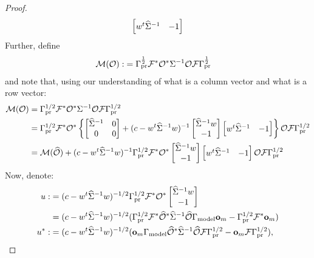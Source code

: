 \documentclass{amsart}
\numberwithin{equation}{section}
\begin{document}
\begin{proof}
\begin{align*}
\begin{bmatrix}
      w^t \widehat{\Sigma}^{-1} & -1 
    \end{bmatrix}
  \end{align*}
  Further, define
  \begin{align*}
    \mathcal{M} (\mathcal{O} ):&= \Gamma_{\textup{pr}}^{\frac12}\mathcal{F}^* \mathcal{O}^* \Sigma^{-1} \mathcal{O} \mathcal{F}
    \Gamma_{\textup{pr}}^{\frac12}    
  \end{align*}
  and note that, using our understanding of what is a column vector and
  what is a row vector:
  \begin{align*}
    \mathcal{M}(\mathcal{O}) &= \Gamma_{\textup{pr}}^{1/2} \mathcal{F}^* \mathcal{O}^* \Sigma^{-1} \mathcal{O} \mathcal{F} \Gamma_{\textup{pr}}^{1/2} \\
    &= \Gamma_{\textup{pr}}^{1/2} \mathcal{F}^* \mathcal{O}^* \left \{
    \begin{bmatrix}
      \widehat{\Sigma}^{-1} & 0 \\
      0           & 0 
    \end{bmatrix}
    + (c -w^t \widehat{\Sigma}^{-1} w )^{-1}
    \begin{bmatrix}
      \widehat{\Sigma}^{-1} w \\
      -1
    \end{bmatrix}
    \begin{bmatrix}
      w^t \widehat{\Sigma}^{-1} & -1 
    \end{bmatrix} 
    \right \} \mathcal{O} \mathcal{F} \Gamma_{\textup{pr}}^{1/2} \\
    &= \mathcal{M} (\widehat{\mathcal{O}}) + (c -w^t \widehat{\Sigma}^{-1} w )^{-1}
    \Gamma_{\textup{pr}}^{1/2} \mathcal{F}^* \mathcal{O}^*
    \begin{bmatrix}
      \widehat{\Sigma}^{-1} w \\
      -1
    \end{bmatrix}
    \begin{bmatrix}
      w^t \widehat{\Sigma}^{-1} & -1 
    \end{bmatrix} 
    \mathcal{O} \mathcal{F} \Gamma_{\textup{pr}}^{1/2}
  \end{align*}
  Now, denote:
  \begin{align}\label{eq:u}
    \begin{split}
      u :&= (c -w^t \Sigmam^{-1} w )^{-1/2}
      \prcov^{1/2} \fwd^* \obs^* 
      \begin{bmatrix}
        \Sigmam^{-1} w \\
        -1 
      \end{bmatrix} \\
      & = (c -w^t \Sigmam^{-1} w )^{-1/2} ( \prcov^{1/2}\fwd^* \obsm^* \Sigmam^{-1} \obsm  \modcov \meas_m - \prcov^{1/2} \fwd^* \meas_m )\\
      u^* :&=  (c -w^t \Sigmam^{-1} w )^{-1/2} (\meas_m \modcov \obsm^* \Sigmam^{-1} \obsm \fwd \prcov^{1/2} - \meas_m \fwd \prcov^{1/2} ),

\end{split}
\end{align}
\end{proof}
\end{document}

